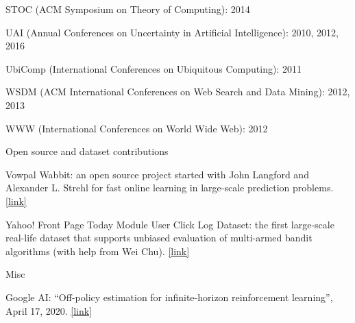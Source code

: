 \documentclass[10pt,twoside,letterpaper]{article}
\newcommand{\negitemspace}{\vspace{1mm}}
\begin{document}
\begin{compactitem}
\begin{compactitem}
\item{STOC (ACM Symposium on Theory of Computing): 2014}

\item{UAI (Annual Conferences on Uncertainty in Artificial
Intelligence): 2010, 2012, 2016}

\item{UbiComp (International Conferences on Ubiquitous Computing): 2011}

\item{WSDM (ACM International Conferences on Web Search and Data Mining): 2012, 2013}

\item{WWW (International Conferences on World Wide Web): 2012}

\end{compactitem} \negitemspace


\item{Open source and dataset contributions} \negitemspace

\begin{compactitem}

\item{Vowpal Wabbit: an open source project started with John Langford and
Alexander L. Strehl for fast online learning in large-scale
prediction problems. \href{https://github.com/VowpalWabbit/vowpal_wabbit/wiki}{[link]}}

\item{Yahoo! Front Page Today Module User Click Log Dataset: the first large-scale real-life dataset that supports unbiased evaluation of multi-armed bandit algorithms (with help from Wei Chu). \href{http://webscope.sandbox.yahoo.com/catalog.php?datatype=r}{[link]}}


\end{compactitem} \negitemspace

\item{Misc} \negitemspace

\begin{compactitem}

\item{Google AI: ``Off-policy estimation for infinite-horizon reinforcement learning'', April 17, 2020. \href{https://ai.googleblog.com/2020/04/off-policy-estimation-for-infinite.html}{[link]}}


\end{compactitem}
\end{compactitem}
\end{document}
